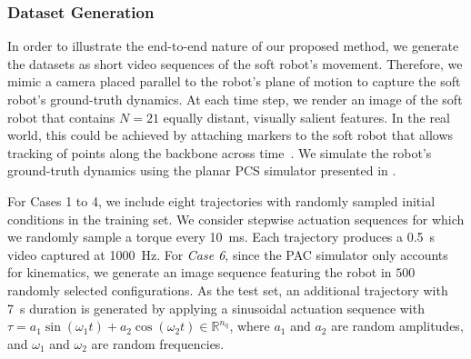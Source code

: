 \subsubsection{Dataset Generation}
In order to illustrate the end-to-end nature of our proposed method, we generate the datasets as short video sequences of the soft robot's movement. 
Therefore, we mimic a camera placed parallel to the robot's plane of motion to capture the soft robot's ground-truth dynamics.
At each time step, we render an image of the soft robot that contains $N=21$ equally distant, visually salient features. In the real world, this could be achieved by attaching markers to the soft robot that allows tracking of points along the backbone across time~\cite{stella2022experimental}.
We simulate the robot's ground-truth dynamics using the planar \gls{PCS} simulator presented in \cite{stolzle2024experimental}.

For Cases 1 to 4, we include eight trajectories with randomly sampled initial conditions in the training set. We consider stepwise actuation sequences for which we randomly sample a torque every \SI{10}{ms}. Each trajectory produces a \SI{0.5}{s} video captured at \SI{1000}{Hz}. For \emph{Case 6}, since the PAC simulator only accounts for kinematics, we generate an image sequence featuring the robot in $500$ randomly selected configurations.
As the test set, an additional trajectory with \SI{7}{s} duration is generated by applying a sinusoidal actuation sequence with $\tau = a_1\sin{(\omega_1 t)} + a_2\cos{(\omega_2 t)} \in \mathbb{R}^{n_\mathrm{q}}$, where $a_1$ and $a_2$ are random amplitudes, and $\omega_1$ and $\omega_2$ are random frequencies.

